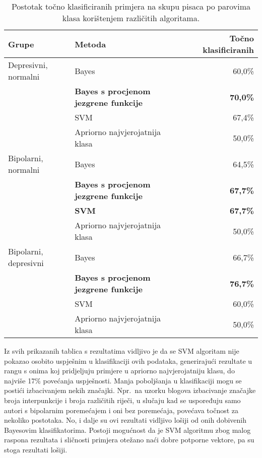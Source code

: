 \documentclass[10pt, a4paper]{article}
\begin{document}
\begin{table*}
\caption{Postotak točno klasificiranih primjera na skupu pisaca po parovima klasa korištenjem različitih algoritama.}
\label{tab:rezultPisciGrupa}
\begin{center}
\begin{tabular}{llr}
\toprule
Grupe & Metoda & Točno klasificiranih\\
\midrule
Depresivni, normalni & Bayes & 60,0\%\\
 &  \textbf{Bayes s procjenom jezgrene funkcije} &  \textbf{70,0\%}\\
 & SVM & 67,4\%\\
  & Apriorno najvjerojatnija klasa & 50,0\%\\
\midrule
Bipolarni, normalni & Bayes & 64,5\%\\
 &  \textbf{Bayes s procjenom jezgrene funkcije} &  \textbf{67,7\%}\\
 &  \textbf{SVM} &  \textbf{67,7\%}\\
  & Apriorno najvjerojatnija klasa & 50,0\%\\
\midrule
Bipolarni, depresivni &  Bayes &  66,7\%\\
 &  \textbf{Bayes s procjenom jezgrene funkcije} &  \textbf{76,7\%}\\
  & SVM & 60,0\%\\
   & Apriorno najvjerojatnija klasa & 50,0\%\\
\bottomrule
\end{tabular}
\end{center}
\end{table*}

Iz svih prikazanih tablica s rezultatima vidljivo je da se SVM algoritam nije pokazao osobito uspješnim u klasifikaciji ovih podataka, generirajući rezultate u rangu s onima koj pridjeljuju primjere u apriorno najvjerojatniju klasu, do najviše 17\% povećanja uspješnosti. Manja poboljšanja u klasifikaciji mogu se postići izbacivanjem nekih značajki. Npr.~na uzorku blogova izbacivanje značajke broja interpunkcije i broja različitih riječi, u slučaju kad se uspoređuju samo autori s bipolarnim poremećajem i oni bez poremećaja, povećava točnost za nekoliko postotaka. No, i dalje su ovi rezultati vidljivo lošiji od onih dobivenih Bayesovim klasifikatorima. Postoji mogućnost da je SVM algoritmu zbog malog raspona rezultata i sličnosti primjera otežano naći dobre potporne vektore, pa su stoga rezultati lošiji. 
\end{document}
